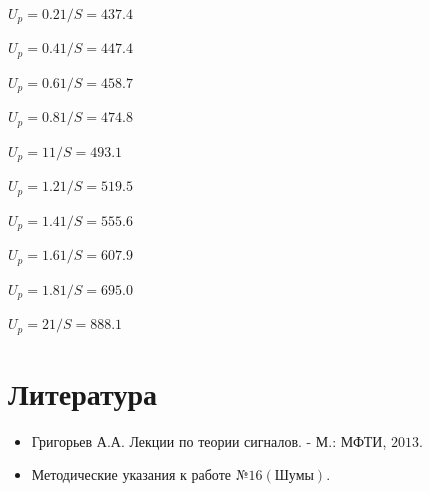 \documentclass[a4paper, 14pt]{extarticle}%
\begin{document}
$U_p = 0.2 1/S = 437.4$

$U_p = 0.4 1/S = 447.4$

$U_p = 0.6 1/S = 458.7$

$U_p = 0.8 1/S = 474.8$

$U_p = 1 1/S = 493.1$

$U_p = 1.2 1/S = 519.5$

$U_p = 1.4 1/S = 555.6$

$U_p = 1.6 1/S = 607.9$

$U_p = 1.8 1/S = 695.0$

$U_p = 2 1/S = 888.1$

\section{Литература}

\begin{itemize}

\item Григорьев А.А. Лекции по теории сигналов. - М.: МФТИ, $2013 .$

\item Методические указания к работе №$16 (\text{Шумы})$.

\end{itemize}
\end{document}
